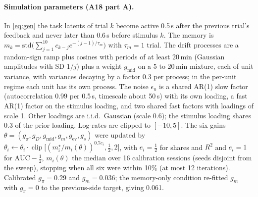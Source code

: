 \documentclass{article}
\begin{document}
\paragraph{Simulation parameters (A18 part A).} In \eqref{eq:gen} the task latents of trial $k$ become active 0.5\,s
after the previous trial's feedback and never later than 0.6\,s before stimulus $k$. The memory is
$m_k = \mathrm{std}\big(\sum_{j=1}^{10} c_{k-j} e^{-(j-1)/\tau_m}\big)$ with $\tau_m = 1$ trial. The drift processes
are a random-sign ramp plus cosines with periods of at least 20\,min (Gaussian amplitudes with SD $1/j$) plus a
weight $g_{\mathrm{mid}}$ on a 5 to 20\,min mixture, each of unit variance, with variances decaying by a factor 0.3 per
process; in the per-unit regime each unit has its own process. The noise $\epsilon_u$ is a shared AR(1) slow factor
(autocorrelation 0.99 per 0.5\,s, timescale about 50\,s) with its own loading, a fast AR(1) factor on the stimulus
loading, and two shared fast factors with loadings of scale 1. Other loadings are i.i.d.\ Gaussian (scale 0.6); the
stimulus loading shares 0.3 of the prior loading. Log-rates are clipped to $[-10, 5]$. The six
gains $\theta = (g_\pi, g_D, g_{\mathrm{mid}}, g_m, g_{\mathrm{ev}}, g_s)$ were updated by
$\theta_i \leftarrow \theta_i \cdot \operatorname{clip}\big[(m^\star_i / m_i(\theta))^{0.7 e_i}, \tfrac12, 2\big]$,
with $e_i = \tfrac12$ for shares and $R^2$ and $e_i = 1$ for $\mathrm{AUC} - \tfrac12$, $m_i(\theta)$ the median over 16
calibration sessions (seeds disjoint from the sweep), stopping when all six were within 10\% (at most 12 iterations).
Calibrated $g_\pi = 0.29$ and $g_m = 0.036$; the memory-only condition re-fitted $g_m$ with $g_\pi = 0$ to the
previous-side target, giving 0.061.
\end{document}
